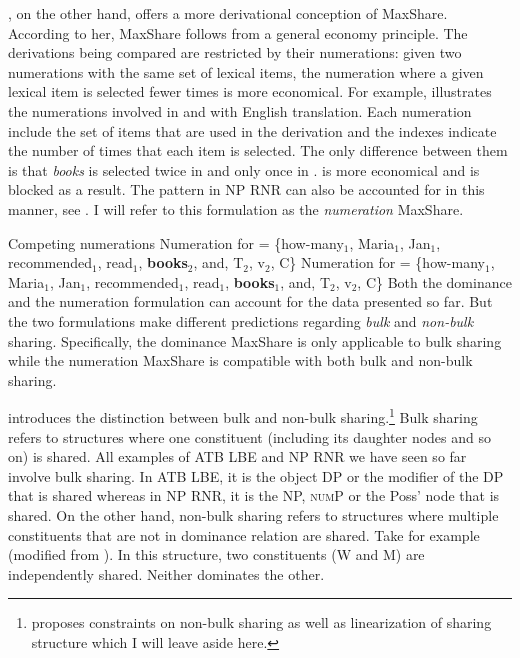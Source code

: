 \documentclass[output=paper]{langscibook}
\begin{document}
\citet{Citko:2006}, on the other hand, offers a more derivational conception of MaxShare. According to her, MaxShare follows from a general economy principle. The derivations being compared are restricted by their numerations: given two numerations with the same set of lexical items, the numeration where a given lexical item is selected fewer times is more economical. For example,  illustrates the numerations involved in  and  with English translation. Each numeration include the set of items that are used in the derivation and the indexes indicate the number of times that each item is selected. The only difference between them is that \textit{books} is selected twice in  and only once in .  is more economical and  is blocked as a result. 
The pattern in NP RNR can also be accounted for in this manner, see \citet[104]{Shen:2018a}. I will refer to this formulation as the \textit{numeration} MaxShare.\largerpage

\ea 
	\label{shenshenex12}
	Competing numerations
	\ea 
		\label{shenshenex12:a}
		Numeration for  = \{how-many$_1$, Maria$_1$, Jan$_1$, recommended$_1$, read$_1$, \textbf{books$_2$}, and, T$_2$, v$_2$, C\}
	\ex 
		\label{shenshenex12:b}
		Numeration for  = \{how-many$_1$, Maria$_1$, Jan$_1$, recommended$_1$, read$_1$, \textbf{books$_1$}, and, T$_2$, v$_2$, C\} 
	\z 
\z 
Both the dominance and the numeration formulation can account for the data presented so far. 
But the two formulations make different predictions regarding \textit{bulk} and \textit{non-bulk} sharing. 
Specifically, the dominance MaxShare is only applicable to bulk sharing while the numeration MaxShare is compatible with both bulk and non-bulk sharing. 

\citet{Gracanin-Yuksek:2007} introduces the distinction between bulk and non-bulk sharing.\footnote{\citet{Gracanin-Yuksek:2007} proposes constraints on non-bulk sharing as well as linearization of sharing structure which I will leave aside here.} 
Bulk sharing refers to structures where one constituent (including its daughter nodes and so on) is shared. 
All examples of ATB LBE and NP RNR we have seen so far involve bulk sharing. 
In ATB LBE, it is the object DP or the modifier of the DP that is shared whereas in NP RNR, it is the NP, \textsc{num}P or the Poss' node that is shared. 
On the other hand, non-bulk sharing refers to structures where multiple constituents that are not in dominance relation are shared. 
Take  for example (modified from \citealt[(14)]{Gracanin-Yuksek:2007}). 
In this structure, two constituents (W and M) are independently shared. 
Neither dominates the other. 
\end{document}
